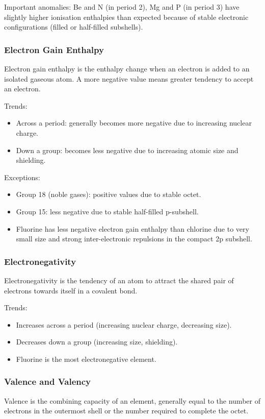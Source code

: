 \documentclass[12pt,a4paper]{article}
\begin{document}
Important anomalies: Be and N (in period 2), Mg and P (in period 3) have slightly higher ionisation enthalpies than expected because of stable electronic configurations (filled or half-filled subshells).

\subsubsection{Electron Gain Enthalpy}
Electron gain enthalpy is the enthalpy change when an electron is added to an isolated gaseous atom. A more negative value means greater tendency to accept an electron.

Trends:
\begin{itemize}
    \item Across a period: generally becomes more negative due to increasing nuclear charge.
    \item Down a group: becomes less negative due to increasing atomic size and shielding.
\end{itemize}

Exceptions:
\begin{itemize}
    \item Group 18 (noble gases): positive values due to stable octet.
    \item Group 15: less negative due to stable half-filled p-subshell.
    \item Fluorine has less negative electron gain enthalpy than chlorine due to very small size and strong inter-electronic repulsions in the compact 2p subshell.
\end{itemize}

\subsubsection{Electronegativity}
Electronegativity is the tendency of an atom to attract the shared pair of electrons towards itself in a covalent bond.

Trends:
\begin{itemize}
    \item Increases across a period (increasing nuclear charge, decreasing size).
    \item Decreases down a group (increasing size, shielding).
    \item Fluorine is the most electronegative element.
\end{itemize}

\subsubsection{Valence and Valency}
Valence is the combining capacity of an element, generally equal to the number of electrons in the outermost shell or the number required to complete the octet.  
\end{document}
